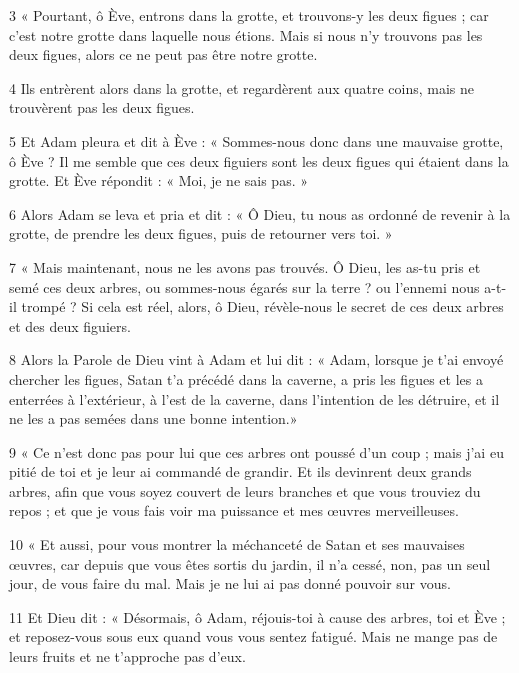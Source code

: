 \par 3 « Pourtant, ô Ève, entrons dans la grotte, et trouvons-y les deux figues ; car c'est notre grotte dans laquelle nous étions. Mais si nous n’y trouvons pas les deux figues, alors ce ne peut pas être notre grotte.

\par 4 Ils entrèrent alors dans la grotte, et regardèrent aux quatre coins, mais ne trouvèrent pas les deux figues.

\par 5 Et Adam pleura et dit à Ève : « Sommes-nous donc dans une mauvaise grotte, ô Ève ? Il me semble que ces deux figuiers sont les deux figues qui étaient dans la grotte. Et Ève répondit : « Moi, je ne sais pas. »

\par 6 Alors Adam se leva et pria et dit : « Ô Dieu, tu nous as ordonné de revenir à la grotte, de prendre les deux figues, puis de retourner vers toi. »

\par 7 « Mais maintenant, nous ne les avons pas trouvés. Ô Dieu, les as-tu pris et semé ces deux arbres, ou sommes-nous égarés sur la terre ? ou l'ennemi nous a-t-il trompé ? Si cela est réel, alors, ô Dieu, révèle-nous le secret de ces deux arbres et des deux figuiers.

\par 8 Alors la Parole de Dieu vint à Adam et lui dit : « Adam, lorsque je t'ai envoyé chercher les figues, Satan t'a précédé dans la caverne, a pris les figues et les a enterrées à l'extérieur, à l'est de la caverne, dans l'intention de les détruire, et il ne les a pas semées dans une bonne intention.»

\par 9 « Ce n'est donc pas pour lui que ces arbres ont poussé d'un coup ; mais j'ai eu pitié de toi et je leur ai commandé de grandir. Et ils devinrent deux grands arbres, afin que vous soyez couvert de leurs branches et que vous trouviez du repos ; et que je vous fais voir ma puissance et mes œuvres merveilleuses.

\par 10 « Et aussi, pour vous montrer la méchanceté de Satan et ses mauvaises œuvres, car depuis que vous êtes sortis du jardin, il n'a cessé, non, pas un seul jour, de vous faire du mal. Mais je ne lui ai pas donné pouvoir sur vous.

\par 11 Et Dieu dit : « Désormais, ô Adam, réjouis-toi à cause des arbres, toi et Ève ; et reposez-vous sous eux quand vous vous sentez fatigué. Mais ne mange pas de leurs fruits et ne t’approche pas d’eux.

